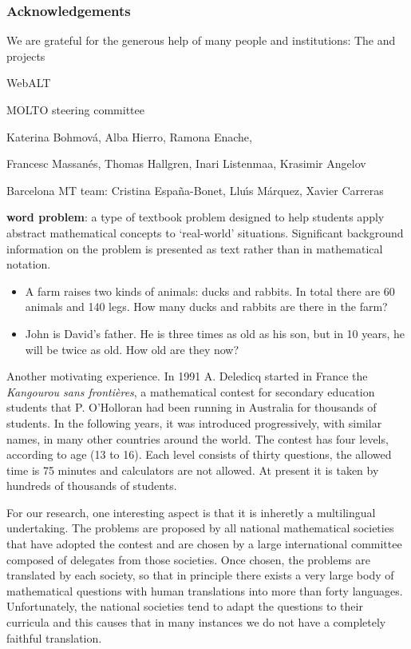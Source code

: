 \documentclass[submission,copyright,creativecommons]{eptcs}
\begin{document}
\subsubsection*{Acknowledgements}
We are grateful for the generous help of many people and
institutions: The \webalt{} and \molto{} projects

WebALT

MOLTO steering committee

Katerina Bohmov\'a, Alba Hierro, Ramona Enache,

Francesc Massan\'es, Thomas Hallgren, Inari Listenmaa, Krasimir Angelov

Barcelona MT team: Cristina Espa\~na-Bonet, Llu\'{\i}s M\'arquez, Xavier
Carreras


\textbf{word problem}: a type of textbook problem
designed to help students
apply abstract mathematical concepts
to `real-world' situations.
Significant background information on the
problem is presented as text rather than in
mathematical notation.

\begin{itemize}
\item[]
A farm raises two kinds of animals: ducks and rabbits. In
total there are 60 animals and 140 legs. How many ducks
and rabbits are there in the farm?
\item[]
John is David's father. He is three times as old as his
son, but in 10 years, he will be twice as old. How old are
they now?
\end{itemize}

Another motivating experience.
In 1991 A. Deledicq started in France the \emph{Kangourou sans
fronti\`eres}, a mathematical contest for secondary education students that
P. O'Holloran had been running in Australia for thousands of students.  In
the following years, it was introduced progressively, with similar names,
in many other countries around the world.  The contest has four levels,
according to age (13 to 16). Each level consists of thirty
questions, the allowed time is 75 minutes and calculators are not allowed.
At present it is taken by hundreds of thousands of students.

For our research, one interesting aspect is that it is inheretly a
multilingual undertaking.  The problems are proposed by all national
mathematical societies that have adopted the contest and are chosen by a
large international committee composed of delegates from those societies.
Once chosen, the problems are translated by each society, so that in
principle there exists a very large body of mathematical questions with
human translations into more than forty languages.  Unfortunately, the
national societies tend to adapt the questions to their curricula and this
causes that in many instances we do not have a completely faithful
translation.
\end{document}
